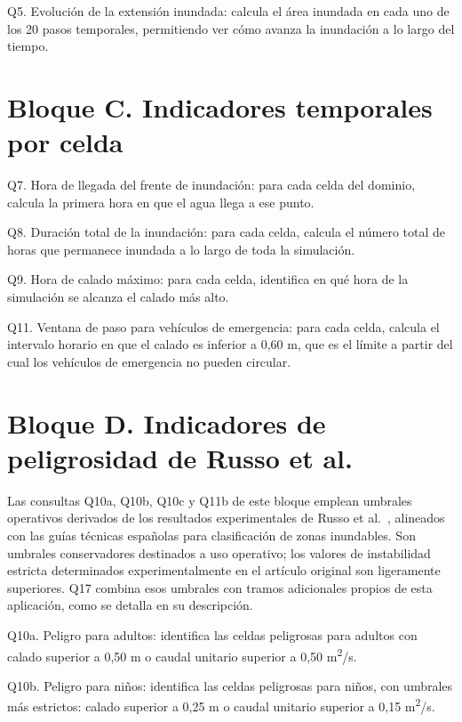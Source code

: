 Q5. Evolución de la extensión inundada: calcula el área inundada en cada uno de los 20 pasos temporales, permitiendo ver cómo avanza la inundación a lo largo del tiempo.

\section{Bloque C. Indicadores temporales por celda}\label{bloque-c.-indicadores-temporales-por-celda}

Q7. Hora de llegada del frente de inundación: para cada celda del dominio, calcula la primera hora en que el agua llega a ese punto.

Q8. Duración total de la inundación: para cada celda, calcula el número total de horas que permanece inundada a lo largo de toda la simulación.

Q9. Hora de calado máximo: para cada celda, identifica en qué hora de la simulación se alcanza el calado más alto.

Q11. Ventana de paso para vehículos de emergencia: para cada celda, calcula el intervalo horario en que el calado es inferior a 0,60 m, que es el límite a partir del cual los vehículos de emergencia no pueden circular.

\section{Bloque D. Indicadores de peligrosidad de Russo et al.}\label{bloque-d.-indicadores-de-peligrosidad-russo-et-al.-2013}

Las consultas Q10a, Q10b, Q10c y Q11b de este bloque emplean umbrales operativos derivados de los resultados experimentales de Russo et al.\ \cite{russo2013}, alineados con las guías técnicas españolas para clasificación de zonas inundables. Son umbrales conservadores destinados a uso operativo; los valores de instabilidad estricta determinados experimentalmente en el artículo original son ligeramente superiores. Q17 combina esos umbrales con tramos adicionales propios de esta aplicación, como se detalla en su descripción.

Q10a. Peligro para adultos: identifica las celdas peligrosas para adultos con calado superior a 0,50 m o caudal unitario superior a 0,50 m\textsuperscript{2}/s.

Q10b. Peligro para niños: identifica las celdas peligrosas para niños, con umbrales más estrictos: calado superior a 0,25 m o caudal unitario superior a 0,15 m\textsuperscript{2}/s.

